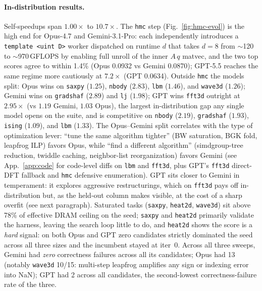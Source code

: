 \documentclass{article}
\theoremstyle{plain}
\theoremstyle{definition}
\theoremstyle{remark}
\begin{document}
\paragraph{In-distribution results.} Self-speedups span $1.00\times$ to
$10.7\times$. The \texttt{hmc} step (Fig.~\ref{fig:hmc-evol}) is the high end for Opus-4.7 and Gemini-3.1-Pro: each independently introduces a
\texttt{template <uint D>} worker dispatched on runtime $d$ that takes
$d{=}8$ from $\sim$120 to $\sim$970\,GFLOPS by enabling full unroll
of the inner $A\,q$ matvec, and the two top scores agree to within
1.4\% (Opus 0.0932 vs Gemini 0.0870); GPT-5.5 reaches the same regime more
cautiously at $7.2\times$ (GPT 0.0634). Outside \texttt{hmc} the models split:
Opus wins on \texttt{saxpy} ($1.25$), \texttt{nbody} ($2.83$), \texttt{lbm} ($1.46$), and
\texttt{wave3d} ($1.26$); Gemini wins on \texttt{gradshaf} ($2.89$) and \texttt{lj} ($1.98$);
GPT wins \texttt{fft3d} outright at $2.95\times$ (vs $1.19$ Gemini,
$1.03$ Opus), the largest in-distribution gap any single model opens
on the suite, and is competitive on \texttt{nbody} ($2.19$), \texttt{gradshaf} ($1.93$),
\texttt{ising} ($1.09$), and \texttt{lbm} ($1.33$). The Opus--Gemini split correlates
with the type of optimization lever: ``tune the same algorithm
tighter'' (BW saturation, BGK fold, leapfrog ILP) favors Opus,
while ``find a different algorithm'' (simdgroup-tree reduction,
twiddle caching, neighbor-list reorganization) favors Gemini (see
App.~\ref{app:code} for code-level diffs on \texttt{lbm} and \texttt{fft3d}, plus
GPT's \texttt{fft3d} direct-DFT fallback and \texttt{hmc} defensive
enumeration). GPT
sits closer to Gemini in temperament: it explores aggressive
restructurings, which on \texttt{fft3d} pays off in-distribution but, as the
held-out column makes visible, at the cost of a sharp overfit
(see next paragraph).
Saturated tasks (\texttt{saxpy},
\texttt{heat2d}, \texttt{wave3d}) sit above 78\% of effective DRAM ceiling on the seed;
\texttt{saxpy} and \texttt{heat2d} primarily validate the harness, leaving the search
loop little to do, and \texttt{heat2d} shows the score is a \emph{hard}
signal: on both Opus and GPT zero candidates strictly dominated
the seed across all three sizes and the incumbent stayed at iter~0.
Across all three sweeps, Gemini had \emph{zero} correctness failures
across all its candidates; Opus had 13
(notably \texttt{wave3d} 10/15: multi-step leapfrog amplifies any sign or
indexing error into NaN); GPT had 2 across all candidates,
the second-lowest correctness-failure rate of the three.
\end{document}
